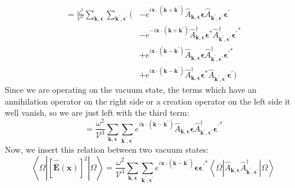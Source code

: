 \documentclass[12pt]{article}
\begin{document}
\begin{equation}
\begin{aligned}
=\frac{\omega ^2}{\mathcal{V}^{3}}\sum_{\mathbf{k}, \boldsymbol{\epsilon}}\sum_{\mathbf{k^{\prime}}, \boldsymbol{\epsilon^{\prime}}}\Bigg( 
&-e^{i \mathbf{x}\cdot (\mathbf{k}+\mathbf{k^{\prime}})}\hat{A}_{\mathbf{k}, \boldsymbol{\epsilon}} \boldsymbol{\epsilon} \hat{A}_{\mathbf{k^{\prime}}, \boldsymbol{\epsilon^{\prime}}} \boldsymbol{\epsilon^{\prime}} \\
&- e^{-i \mathbf{x}\cdot (\mathbf{k}+\mathbf{k^{\prime}})}\hat{A}_{\mathbf{k}, \boldsymbol{\epsilon}}^{\dagger} \boldsymbol{\epsilon}^{*} \hat{A}_{\mathbf{k^{\prime}}, \boldsymbol{\epsilon^{\prime}}}^{\dagger} \boldsymbol{\epsilon^{\prime}}^{*}\\
&+ e^{i \mathbf{x}\cdot (\mathbf{k}-\mathbf{k^{\prime}})}\hat{A}_{\mathbf{k}, \boldsymbol{\epsilon}} \boldsymbol{\epsilon} \hat{A}_{\mathbf{k^{\prime}}, \boldsymbol{\epsilon^{\prime}}}^{\dagger} \boldsymbol{\epsilon^{\prime}}^{*} \\
&+ e^{i \mathbf{x}\cdot (\mathbf{k}-\mathbf{k^{\prime}})}\hat{A}_{\mathbf{k}, \boldsymbol{\epsilon}}^{\dagger} \boldsymbol{\epsilon}^{*} \hat{A}_{\mathbf{k^{\prime}}, \boldsymbol{\epsilon^{\prime}}} \boldsymbol{\epsilon^{\prime}}\Bigg)
\end{aligned}
\end{equation}
Since we are operating on the vacuum state, the terms which have an annihilation operator on the right side or a creation operator on the left side it well vanish, so we are just left with the third term:
\begin{equation}
  =\frac{\omega ^2}{\mathcal{V}^{3}}\sum_{\mathbf{k}, \boldsymbol{\epsilon}}\sum_{\mathbf{k^{\prime}}, \boldsymbol{\epsilon^{\prime}}}e^{i \mathbf{x}\cdot (\mathbf{k}-\mathbf{k^{\prime}})}\hat{A}_{\mathbf{k}, \boldsymbol{\epsilon}} \boldsymbol{\epsilon} \hat{A}_{\mathbf{k^{\prime}}, \boldsymbol{\epsilon^{\prime}}}^{\dagger} \boldsymbol{\epsilon^{\prime}}^{*}
\end{equation}
Now, we insert this relation between two vacuum states:
\begin{equation}
  \left\langle\Omega\left|[\hat{\overline{\mathbf{E}}}(\mathbf{x})]^{2}\right| \Omega\right\rangle = \frac{\omega ^2}{\mathcal{V}^{3}}\sum_{\mathbf{k}, \boldsymbol{\epsilon}}\sum_{\mathbf{k^{\prime}}, \boldsymbol{\epsilon^{\prime}}}e^{i \mathbf{x}\cdot (\mathbf{k}-\mathbf{k^{\prime}})}\boldsymbol{\epsilon} \boldsymbol{\epsilon^{\prime}}^{*}\left\langle\Omega\left|\hat{A}_{\mathbf{k}, \boldsymbol{\epsilon}} \hat{A}_{\mathbf{k^{\prime}}, \boldsymbol{\epsilon^{\prime}}}^{\dagger}\right| \Omega\right\rangle
\end{equation}
\end{document}
